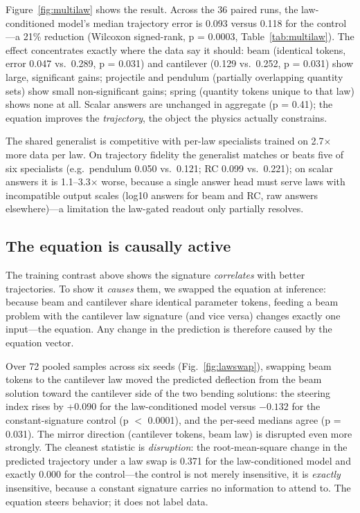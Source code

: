 \documentclass[11pt,a4paper]{article}
\begin{document}
Figure~\ref{fig:multilaw} shows the result. Across the 36 paired runs, the
law-conditioned model's median trajectory error is 0.093 versus 0.118 for the
control---a 21\% reduction (Wilcoxon signed-rank, p = 0.0003,
Table~\ref{tab:multilaw}). The effect concentrates exactly where the data say
it should: beam (identical tokens, error 0.047 vs.\ 0.289, p = 0.031) and
cantilever (0.129 vs.\ 0.252, p = 0.031) show large, significant gains;
projectile and pendulum (partially overlapping quantity sets) show small
non-significant gains; spring (quantity tokens unique to that law) shows none
at all. Scalar answers are unchanged in aggregate (p = 0.41); the equation
improves the \emph{trajectory}, the object the physics actually constrains.

The shared generalist is competitive with per-law specialists trained on
2.7$\times$ more data per law. On trajectory fidelity the generalist matches
or beats five of six specialists (e.g.\ pendulum 0.050 vs.\ 0.121; RC 0.099
vs.\ 0.221); on scalar answers it is 1.1--3.3$\times$ worse, because a single
answer head must serve laws with incompatible output scales (log10 answers
for beam and RC, raw answers elsewhere)---a limitation the law-gated readout
only partially resolves.

\subsection{The equation is causally active}
\label{sec:causal}

The training contrast above shows the signature \emph{correlates} with better
trajectories. To show it \emph{causes} them, we swapped the equation at
inference: because beam and cantilever share identical parameter tokens,
feeding a beam problem with the cantilever law signature (and vice versa)
changes exactly one input---the equation. Any change in the prediction is
therefore caused by the equation vector.

Over 72 pooled samples across six seeds (Fig.~\ref{fig:lawswap}), swapping
beam tokens to the cantilever law moved the predicted deflection from the beam
solution toward the cantilever side of the two bending solutions: the
steering index rises by +0.090 for the law-conditioned model versus
$-0.132$ for the constant-signature control (p $<$ 0.0001), and the
per-seed medians agree (p = 0.031). The mirror direction (cantilever tokens,
beam law) is disrupted even more strongly. The cleanest statistic is
\emph{disruption}: the root-mean-square change in the predicted trajectory
under a law swap is 0.371 for the law-conditioned model and exactly 0.000
for the control---the control is not merely insensitive, it is \emph{exactly}
insensitive, because a constant signature carries no information to attend to.
The equation steers behavior; it does not label data.
\end{document}
